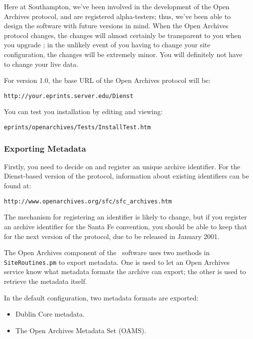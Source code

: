 Here at Southampton, we've been involved in the development of the Open Archives protocol, and are registered alpha-testers; thus, we've been able to design the software with future versions in mind. When the Open Archives protocol changes, the changes will almost certainly be transparent to you when you upgrade \eprints; in the unlikely event of you having to change your site configuration, the changes will be extremely minor. You will definitely not have to change your live data.

For version 1.0, the base URL of the Open Archives protocol will be:

\begin{verbatim}
http://your.eprints.server.edu/Dienst
\end{verbatim}

You can test you installation by editing and viewing:

\begin{verbatim}
eprints/openarchives/Tests/InstallTest.htm
\end{verbatim}


\subsubsection{Exporting Metadata}

Firstly, you need to decide on and register an unique archive identifier. For the Dienst-based version of the protocol, information about existing identifiers can be found at:

\begin{verbatim}
http://www.openarchives.org/sfc/sfc_archives.htm
\end{verbatim}

The mechanism for registering an identifier is likely to change, but if you register an archive identifier for the Santa Fe convention, you should be able to keep that for the next version of the protocol, due to be released in January 2001.

The Open Archives component of the \eprints\ software uses two methods in {\tt SiteRoutines.pm} to export metadata. One is used to let an Open Archives service know what metadata formats the archive can export; the other is used to retrieve the metadata itself.

In the default configuration, two metadata formats are exported:

\begin{itemize}
\item Dublin Core metadata.
\item The Open Archives Metadata Set (OAMS).
\end{itemize}

